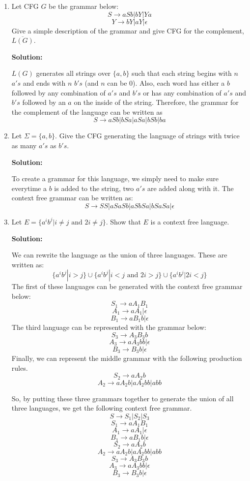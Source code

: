 \documentclass[11pt]{article}
\begin{document}
\begin{enumerate}
\newpage
\item
Let CFG $G$ be the grammar below:
$$ S \rightarrow aSb | bY | Ya $$
$$ Y \rightarrow bY | aY | \epsilon $$
Give a simple description of the grammar and give CFG for the complement, $\overline{L(G)}$.  

\textbf{Solution: }

$L(G)$ generates all strings over $\{ a,b \}$ such that each string begins with $n$ $a's$ and ends with $n$ $b's$ (and $n$ can be $0$).  Also, each word has either a $b$ followed by any combination of $a's$ and $b's$ or has any combination of $a's$ and $b's$ followed by an $a$ on the inside of the string.  Therefore, the grammar for the complement of the language can be written as 
$$ S \rightarrow aSb | bSa | aSa | bSb | ba $$

\item
Let $\Sigma = \{ a,b \}$.  Give the CFG generating the language of strings with twice as many $a's$ as $b's$.  

\textbf{Solution: }

To create a grammar for this language, we simply need to make sure everytime a $b$ is added to the string, two $a's$ are added along with it.  The context free grammar can be written as:
$$ S \rightarrow SS | aSaSb | aSbSa | bSaSa | \epsilon $$

\item
Let $E = \{ a^ib^j | i \neq j \text{ and } 2i \neq j \}$.  Show that $E$ is a context free language.  

\textbf{Solution: }

We can rewrite the language as the union of three languages.  These are written as:
$$ \{ a^ib^j | i > j \} \cup \{ a^ib^j | i < j \text{ and } 2i > j \} \cup \{ a^ib^j | 2i < j \} $$
The first of these languages can be generated with the context free grammar below:
$$ S_1 \rightarrow aA_1B_1 $$
$$ A_1 \rightarrow aA_1 | \epsilon $$
$$ B_1 \rightarrow aB_1b | \epsilon $$
The third language can be represented with the grammar below:
$$ S_3 \rightarrow A_3B_3b $$
$$ A_3 \rightarrow aA_3bb | \epsilon $$
$$ B_3 \rightarrow B_3b | \epsilon$$
Finally, we can represent the middle grammar with the following production rules.  
$$ S_2 \rightarrow aA_2b $$
$$ A_2 \rightarrow aA_2b | aA_2bb | abb $$

\newpage
So, by putting these three grammars together to generate the union of all three languages, we get the following context free grammar.  
$$ S \rightarrow S_1 | S_2 | S_3 $$
$$ S_1 \rightarrow aA_1B_1 $$
$$ A_1 \rightarrow aA_1 | \epsilon $$
$$ B_1 \rightarrow aB_1b | \epsilon $$
$$ S_2 \rightarrow aA_2b $$
$$ A_2 \rightarrow aA_2b | aA_2bb | abb $$
$$ S_3 \rightarrow A_3B_3b $$
$$ A_3 \rightarrow aA_3bb | \epsilon $$
$$ B_3 \rightarrow B_3b | \epsilon$$

\end{enumerate}
\end{document}
